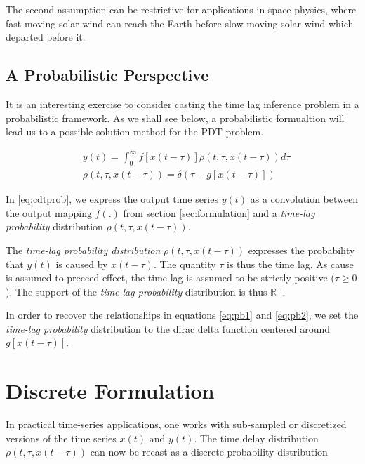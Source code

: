 \documentclass[envcountsect,runningheads]{llncs}
\theoremstyle{etoile}
\begin{document}
The second assumption can be restrictive for applications in space physics, where fast moving 
solar wind can reach the Earth before slow moving solar wind which departed before it. 

\subsection{A Probabilistic Perspective}\label{sec:cdtprobform}

It is an interesting exercise to consider casting the time lag inference problem in a probabilistic framework.
As we shall see below, a probabilistic formualtion will lead us to a possible solution method
for the PDT problem. 

\begin{align} \label{eq:cdtprob}
      &y(t) = \int_{0}^{\infty}{f[x(t - \tau)] \rho(t, \tau, x(t - \tau))}d \tau \\
      & \nonumber \rho(t, \tau, x(t - \tau))  = \delta(\tau - g[x(t - \tau)])
\end{align}

In \ref{eq:cdtprob}, we express the output time series $y(t)$ as a convolution between
the output mapping $f(.)$ from section \ref{sec:formulation} and a \emph{time-lag probability}
distribution $\rho(t, \tau, x(t - \tau))$. 

The \emph{time-lag probability distribution} $\rho(t, \tau, x(t - \tau))$ expresses the probability 
that $y(t)$ is caused by $x(t - \tau)$. The quantity $\tau$ is thus the time lag. 
As cause is assumed to preceed effect, the time lag is assumed to be strictly positive ($\tau \geq 0$). 
The support of the \emph{time-lag probability} distribution is thus $\mathbb{R}^+$.

In order to recover the relationships in equations \ref{eq:pb1} and \ref{eq:pb2}, we 
set the \emph{time-lag probability} distribution to the dirac delta function centered
around $g[x(t - \tau)]$.


\section{Discrete Formulation}

In practical time-series applications, one works with sub-sampled or discretized versions of the time 
series $x(t)$ and $y(t)$. The time delay distribution $\rho(t, \tau, x(t - \tau))$ can now be recast as 
a discrete probability distribution 
\end{document}
